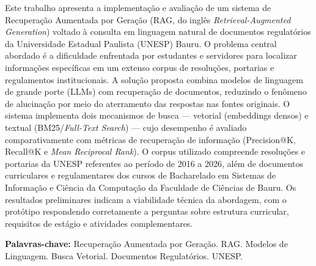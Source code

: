 \documentclass[
  12pt,
  openright,
  twoside,
  a4paper,
  brazil
]{abntex2}
\begin{document}
\begin{resumo}
Este trabalho apresenta a implementação e avaliação de um sistema de Recuperação Aumentada por Geração (RAG, do inglês \textit{Retrieval-Augmented Generation}) voltado à consulta em linguagem natural de documentos regulatórios da Universidade Estadual Paulista (UNESP) Bauru. O problema central abordado é a dificuldade enfrentada por estudantes e servidores para localizar informações específicas em um extenso corpus de resoluções, portarias e regulamentos institucionais. A solução proposta combina modelos de linguagem de grande porte (LLMs) com recuperação de documentos, reduzindo o fenômeno de alucinação por meio do aterramento das respostas nas fontes originais. O sistema implementa dois mecanismos de busca --- vetorial (embeddings densos) e textual (BM25/\textit{Full-Text Search}) --- cujo desempenho é avaliado comparativamente com métricas de recuperação de informação (Precision@K, Recall@K e \textit{Mean Reciprocal Rank}). O corpus utilizado compreende resoluções e portarias da UNESP referentes ao período de 2016 a 2026, além de documentos curriculares e regulamentares dos cursos de Bacharelado em Sistemas de Informação e Ciência da Computação da Faculdade de Ciências de Bauru. Os resultados preliminares indicam a viabilidade técnica da abordagem, com o protótipo respondendo corretamente a perguntas sobre estrutura curricular, requisitos de estágio e atividades complementares.

\vspace{\onelineskip}
\noindent\textbf{Palavras-chave:} Recuperação Aumentada por Geração. RAG. Modelos de Linguagem. Busca Vetorial. Documentos Regulatórios. UNESP.
\end{resumo}
\end{document}
